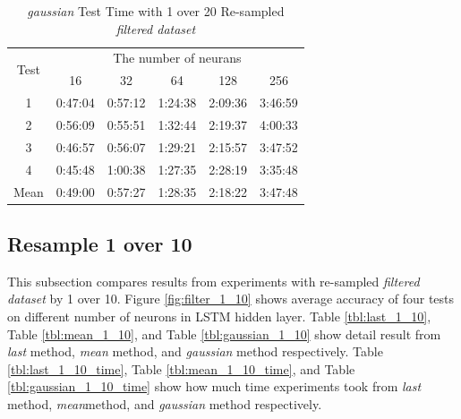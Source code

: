 \documentclass[draft,dvipsnames]{drexel-thesis}
\begin{document}
\begin{thesis}
\begin{table}[!t]
\centering
\caption{{\em gaussian} Test Time with 1 over 20 Re-sampled {\em filtered dataset}}
\label{tbl:gaussian_1_20_time}
\begin{tabular}{|c|c|c|c|c|c|}
\hline
\multirow{2}{*}{Test}      & \multicolumn{5}{c|}{The number of neurans}                                                                                                               \\ \cline{2-6} 
                           & 16                           & 32                           & 64                           & 128                          & 256                          \\ \hline
1                          & 0:47:04                      & 0:57:12                      & 1:24:38                      & 2:09:36                      & 3:46:59                      \\ \hline
2                          & 0:56:09                      & 0:55:51                      & 1:32:44                      & 2:19:37                      & 4:00:33                      \\ \hline
3                          & 0:46:57                      & 0:56:07                      & 1:29:21                      & 2:15:57                      & 3:47:52                      \\ \hline
4                          & 0:45:48                      & 1:00:38                      & 1:27:35                      & 2:28:19                      & 3:35:48                      \\ \hline
\multicolumn{1}{|l|}{Mean} & \multicolumn{1}{l|}{0:49:00} & \multicolumn{1}{l|}{0:57:27} & \multicolumn{1}{l|}{1:28:35} & \multicolumn{1}{l|}{2:18:22} & \multicolumn{1}{l|}{3:47:48} \\ \hline
\end{tabular}
\end{table}


\subsection{Resample 1 over 10}
This subsection compares results from experiments with re-sampled {\em filtered dataset} by 1 over 10. Figure \ref{fig:filter_1_10} shows average accuracy of four tests on different number of neurons in LSTM hidden layer. Table \ref{tbl:last_1_10}, Table \ref{tbl:mean_1_10}, and Table \ref{tbl:gaussian_1_10} show detail result from {\em last} method, {\em mean} method, and {\em gaussian} method respectively. Table \ref{tbl:last_1_10_time}, Table \ref{tbl:mean_1_10_time}, and Table \ref{tbl:gaussian_1_10_time} show how much time experiments took from {\em last} method, {\em mean}method, and {\em gaussian} method respectively.


\end{thesis}
\end{document}
